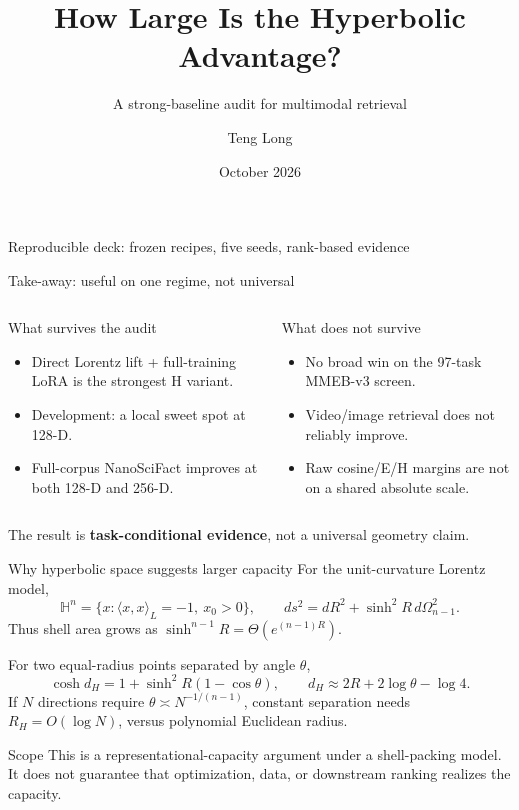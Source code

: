 \documentclass[aspectratio=169,10pt]{beamer}
\title{How Large Is the Hyperbolic Advantage?}
\subtitle{A strong-baseline audit for multimodal retrieval}
\author{Teng Long}
\date{October 2026}
\begin{document}
\begin{frame}
  \titlepage
  \vspace{-1.2em}
  \centering\small Reproducible deck: frozen recipes, five seeds, rank-based evidence
\end{frame}

\begin{frame}{Take-away: useful on one regime, not universal}
\begin{columns}[T]
\begin{block}{What survives the audit}
\begin{itemize}
\item Direct Lorentz lift + full-training LoRA is the strongest H variant.
\item Development: a local sweet spot at 128-D.
\item Full-corpus NanoSciFact improves at both 128-D and 256-D.
\end{itemize}
\end{block}
\begin{alertblock}{What does not survive}
\begin{itemize}
\item No broad win on the 97-task MMEB-v3 screen.
\item Video/image retrieval does not reliably improve.
\item Raw cosine/E/H margins are not on a shared absolute scale.
\end{itemize}
\end{alertblock}
\end{columns}
\vfill
\centering\large The result is \textbf{task-conditional evidence}, not a universal geometry claim.
\end{frame}

\begin{frame}{Why hyperbolic space suggests larger capacity}
For the unit-curvature Lorentz model,
\[
\mathbb H^n=\{x:\langle x,x\rangle_L=-1,\ x_0>0\},\qquad
ds^2=dR^2+\sinh^2R\,d\Omega_{n-1}^2.
\]
Thus shell area grows as $\sinh^{n-1}R=\Theta(e^{(n-1)R})$.

For two equal-radius points separated by angle $\theta$,
\[
\cosh d_H=1+\sinh^2R(1-\cos\theta),\qquad
d_H\approx 2R+2\log\theta-\log4.
\]
If $N$ directions require $\theta\asymp N^{-1/(n-1)}$, constant separation needs
$R_H=O(\log N)$, versus polynomial Euclidean radius.

\begin{alertblock}{Scope}
This is a representational-capacity argument under a shell-packing model. It does not
guarantee that optimization, data, or downstream ranking realizes the capacity.
\end{alertblock}
\end{frame}
\end{document}
